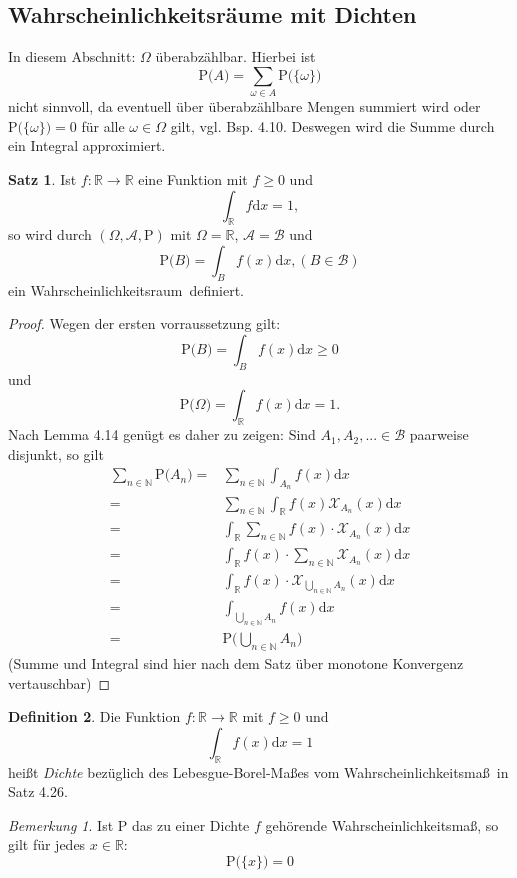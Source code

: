 \documentclass[a4paper,12pt,fleqn]{scrartcl}
\newcommand{\N}{\mathbb{N}}
\newcommand{\R}{\mathbb{R}}
\newcommand{\m}[1]{\mathcal{ #1 }}
\newcommand{\prob}[1]{\text{P(} #1 \text{)}}
\newcommand{\WR}{Wahrscheinlichkeitsraum}
\newcommand{\WM}{Wahrscheinlichkeitsmaß}
\theoremstyle{definition}
\newtheorem{definition}{Definition}[section]
\newtheorem{satz}[definition]{Satz}
\theoremstyle{plain}
\theoremstyle{remark}
\newtheorem*{bemerkung}{Bemerkung}
\begin{document}
\subsection{Wahrscheinlichkeitsräume mit Dichten}
In diesem Abschnitt: $\Omega$ überabzählbar.
Hierbei ist
\[\prob{A}=\sum_{\omega\in A}\prob{\{\omega\}}\]
nicht sinnvoll, da eventuell über überabzählbare Mengen summiert wird oder $\prob{\{\omega\}}=0$ für alle $\omega\in\Omega$ gilt, vgl. Bsp. 4.10. Deswegen wird die Summe durch ein Integral approximiert.
\begin{satz}
Ist $f:\R\to\R$ eine Funktion mit $f\geq 0$ und 
\begin{equation*}
\int_{\R}f\mathrm{d}x=1,
\end{equation*}
so wird durch $(\Omega,\m{A},\text{P})$ mit $\Omega=\R$, $\m{A}=\m{B}$ und
\begin{equation*}
\prob{B}=\int_{B}f(x)\mathrm{d}x,(B\in\m{B})
\end{equation*}
ein \WR \, definiert.
\end{satz}
\begin{proof}
Wegen der ersten vorraussetzung gilt:
\[\prob{B}=\int_Bf(x)\mathrm{d}x\geq 0\]
und
\[\prob{\Omega}=\int_{\R}f(x)\mathrm{d}x=1.\]
Nach Lemma 4.14 genügt es daher zu zeigen: Sind $A_1,A_2,...\in \m{B}$ paarweise disjunkt, so gilt
\begin{align*}
\sum_{n\in\N}\prob{A_n}=&\sum_{n\in\N}\int_{A_n}f(x)\mathrm{d}x\\
=&\sum_{n\in\N}\int_{\R}f(x)\m{X}_{A_n}(x)\mathrm{d}x\\
=&\int_{\R}\sum_{n\in\N}f(x)\cdot\m{X}_{A_n}(x)\mathrm{d}x\\
=&\int_{\R}f(x)\cdot\sum_{n\in\N}\m{X}_{A_n}(x)\mathrm{d}x\\
=&\int_{\R}f(x)\cdot\m{X}_{\bigcup_{n\in\N}A_n}(x)\mathrm{d}x\\
=&\int_{\bigcup_{n\in\N}A_n}f(x)\mathrm{d}x\\
=&\prob{\bigcup_{n\in\N}A_n}
\end{align*}
(Summe und Integral sind hier nach dem Satz über monotone Konvergenz vertauschbar)
\end{proof}
\begin{definition}
Die Funktion $f:\R\to\R$ mit $f\geq 0$ und
\[\int_{\R}f(x)\mathrm{d}x=1\]
heißt \emph{Dichte} bezüglich des Lebesgue-Borel-Maßes vom \WM \, in Satz 4.26.
\end{definition}
\begin{bemerkung}
Ist P das zu einer Dichte $f$ gehörende \WM, so gilt für jedes $x\in\R$:
\[\prob{\{ x\}}=0\]
\end{bemerkung}
\end{document}
